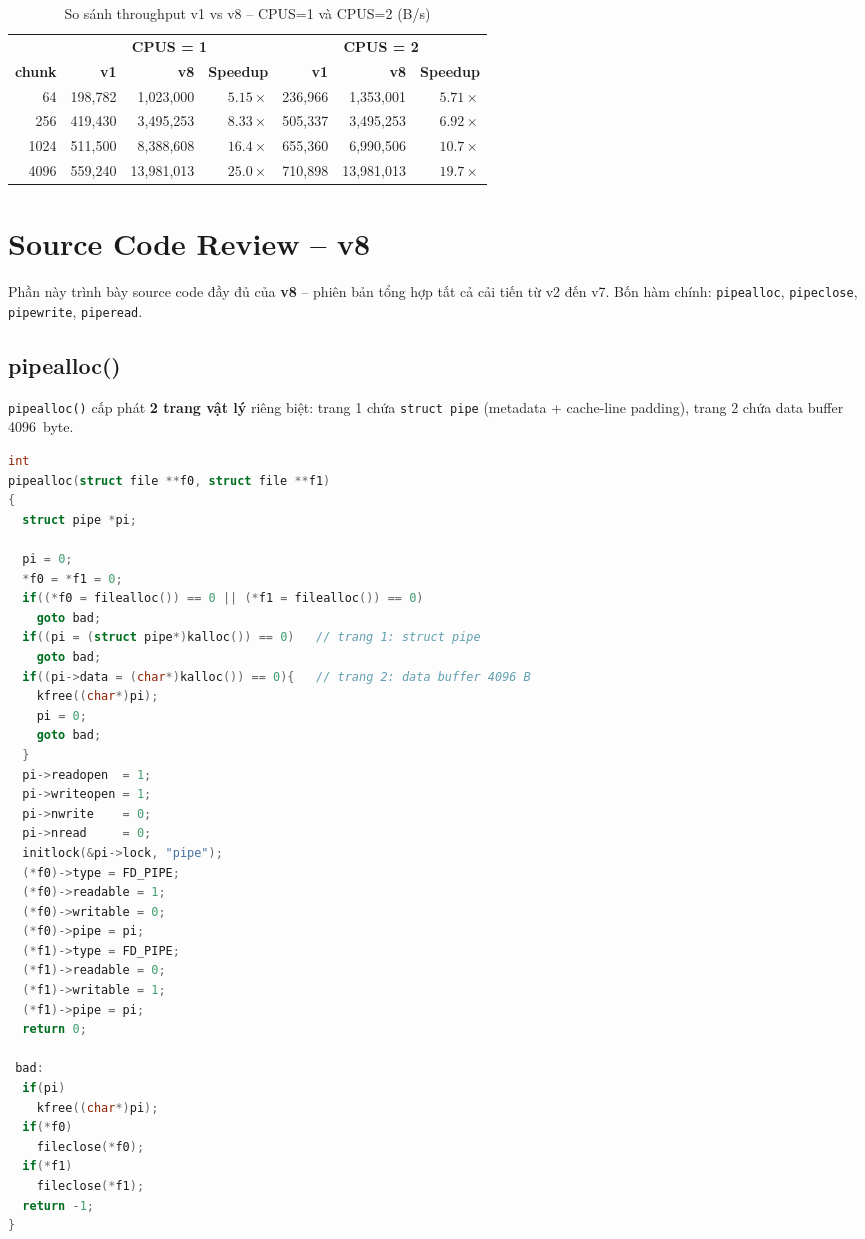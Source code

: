 \documentclass[12pt,a4paper]{article}
\newcommand{\code}[1]{\texttt{#1}}
\begin{document}
\begin{table}[H]
\centering
\small
\caption{So sánh throughput v1 vs v8 -- CPUS=1 và CPUS=2 (B/s)}
\begin{tabular}{rrrrrrr}
\toprule
& \multicolumn{3}{c}{\textbf{CPUS = 1}} & \multicolumn{3}{c}{\textbf{CPUS = 2}} \\
\cmidrule(lr){2-4}\cmidrule(lr){5-7}
\textbf{chunk} & \textbf{v1} & \textbf{v8} & \textbf{Speedup} & \textbf{v1} & \textbf{v8} & \textbf{Speedup} \\
\midrule
64   & 198,782 & 1,023,000  & $5.15\times$ & 236,966 & 1,353,001  & $5.71\times$ \\
256  & 419,430 & 3,495,253  & $8.33\times$ & 505,337 & 3,495,253  & $6.92\times$ \\
1024 & 511,500 & 8,388,608  & $16.4\times$ & 655,360 & 6,990,506  & $10.7\times$ \\
4096 & 559,240 & 13,981,013 & $25.0\times$ & 710,898 & 13,981,013 & $19.7\times$ \\
\bottomrule
\end{tabular}
\end{table}

\section{Source Code Review -- v8}
\label{sec:code}

Phần này trình bày source code đầy đủ của \textbf{v8} -- phiên bản tổng hợp tất cả
cải tiến từ v2 đến v7. Bốn hàm chính: \code{pipealloc}, \code{pipeclose},
\code{pipewrite}, \code{piperead}.

\subsection{pipealloc()}

\code{pipealloc()} cấp phát \textbf{2 trang vật lý} riêng biệt: trang 1 chứa
\code{struct pipe} (metadata + cache-line padding), trang 2 chứa data buffer 4096~byte.

\begin{lstlisting}[caption={pipealloc() -- v8: 2 trang rieng biet (kernel/pipe.c)},
                   language=C]
int
pipealloc(struct file **f0, struct file **f1)
{
  struct pipe *pi;

  pi = 0;
  *f0 = *f1 = 0;
  if((*f0 = filealloc()) == 0 || (*f1 = filealloc()) == 0)
    goto bad;
  if((pi = (struct pipe*)kalloc()) == 0)   // trang 1: struct pipe
    goto bad;
  if((pi->data = (char*)kalloc()) == 0){   // trang 2: data buffer 4096 B
    kfree((char*)pi);
    pi = 0;
    goto bad;
  }
  pi->readopen  = 1;
  pi->writeopen = 1;
  pi->nwrite    = 0;
  pi->nread     = 0;
  initlock(&pi->lock, "pipe");
  (*f0)->type = FD_PIPE;
  (*f0)->readable = 1;
  (*f0)->writable = 0;
  (*f0)->pipe = pi;
  (*f1)->type = FD_PIPE;
  (*f1)->readable = 0;
  (*f1)->writable = 1;
  (*f1)->pipe = pi;
  return 0;

 bad:
  if(pi)
    kfree((char*)pi);
  if(*f0)
    fileclose(*f0);
  if(*f1)
    fileclose(*f1);
  return -1;
}
\end{lstlisting}
\end{document}
